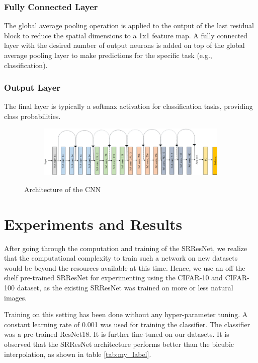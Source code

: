 \documentclass[10pt,twocolumn,letterpaper]{article}
\begin{document}
\subsubsection{Fully Connected Layer}
The global average pooling operation is applied to the output of the last residual block to reduce the spatial dimensions to a 1x1 feature map. A fully connected layer with the desired number of output neurons is added on top of the global average pooling layer to make predictions for the specific task (e.g., classification).

\subsubsection{Output Layer}
The final layer is typically a softmax activation for classification tasks, providing class probabilities.

\begin{figure}
    \centering
    \begin{subfigure}{0.5\textwidth}
        \includegraphics[width=\linewidth]{ResNet18 - 1.png}
    \end{subfigure}
    \caption{Architecture of the CNN}
    \label{fig:enter-label}
\end{figure}

\section{Experiments and Results}
After going through the computation and training of the SRResNet, we realize that the computational complexity to train such a network on new datasets would be beyond the resources available at this time. Hence, we use an off the shelf pre-trained SRResNet for experimenting using the CIFAR-10 and CIFAR-100 dataset, as the existing SRResNet was trained on more or less natural images.

Training on this setting has been done without any hyper-parameter tuning. A constant learning rate of 0.001 was used for training the classifier. The classifier was a pre-trained ResNet18. It is further fine-tuned on our datasets. It is observed that the SRResNet architecture performs better than the bicubic interpolation, as shown in table \ref{tab:my_label}.
\end{document}
